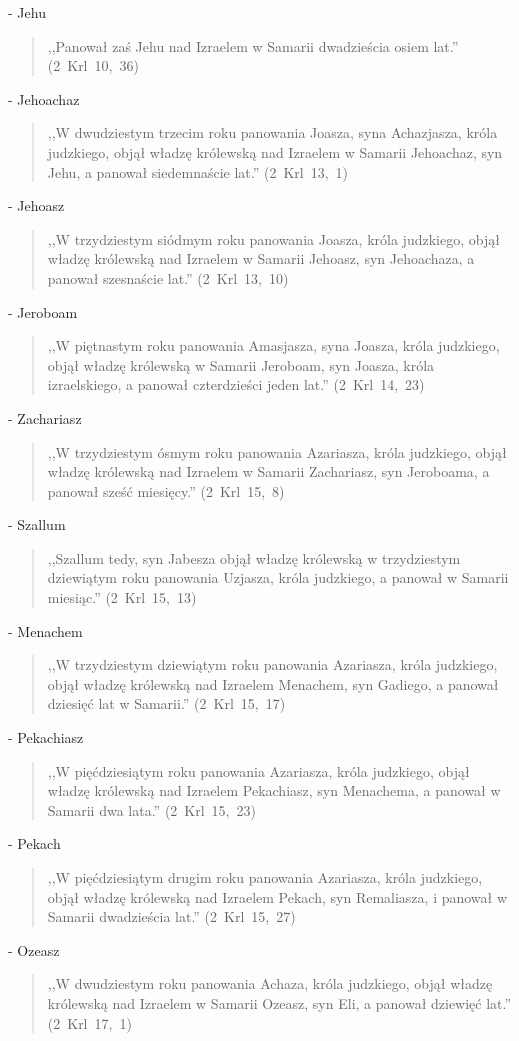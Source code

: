 \documentclass[10pt,a4paper,oneside]{article}
\begin{document}
- Jehu
\begin{quote}
,,Panował zaś Jehu nad Izraelem w Samarii dwadzieścia osiem lat.'' \mbox{(2 Krl 10, 36)}
\end{quote}
- Jehoachaz
\begin{quote}
,,W dwudziestym trzecim roku panowania Joasza, syna Achazjasza, króla judzkiego, objął władzę królewską nad Izraelem w Samarii Jehoachaz, syn Jehu, a panował siedemnaście lat.'' \mbox{(2 Krl 13, 1)}
\end{quote}
- Jehoasz
\begin{quote}
,,W trzydziestym siódmym roku panowania Joasza, króla judzkiego, objął władzę królewską nad Izraelem w Samarii Jehoasz, syn Jehoachaza, a panował szesnaście lat.'' \mbox{(2 Krl 13, 10)}
\end{quote}
- Jeroboam
\begin{quote}
,,W piętnastym roku panowania Amasjasza, syna Joasza, króla judzkiego, objął władzę królewską w Samarii Jeroboam, syn Joasza, króla izraelskiego, a panował czterdzieści jeden lat.'' \mbox{(2 Krl 14, 23)}
\end{quote}
- Zachariasz
\begin{quote}
,,W trzydziestym ósmym roku panowania Azariasza, króla judzkiego, objął władzę królewską nad Izraelem w Samarii Zachariasz, syn Jeroboama, a panował sześć miesięcy.'' \mbox{(2 Krl 15, 8)}
\end{quote}
- Szallum
\begin{quote}
,,Szallum tedy, syn Jabesza objął władzę królewską w trzydziestym dziewiątym roku panowania Uzjasza, króla judzkiego, a panował w Samarii miesiąc.'' \mbox{(2 Krl 15, 13)}
\end{quote}
- Menachem
\begin{quote}
,,W trzydziestym dziewiątym roku panowania Azariasza, króla judzkiego, objął władzę królewską nad Izraelem Menachem, syn Gadiego, a panował dziesięć lat w Samarii.'' \mbox{(2 Krl 15, 17)}
\end{quote}
- Pekachiasz
\begin{quote}
,,W pięćdziesiątym roku panowania Azariasza, króla judzkiego, objął władzę królewską nad Izraelem Pekachiasz, syn Menachema, a panował w Samarii dwa lata.'' \mbox{(2 Krl 15, 23)}
\end{quote}
- Pekach
\begin{quote}
,,W pięćdziesiątym drugim roku panowania Azariasza, króla judzkiego, objął władzę królewską nad Izraelem Pekach, syn Remaliasza, i panował w Samarii dwadzieścia lat.'' \mbox{(2 Krl 15, 27)}
\end{quote}
- Ozeasz
\begin{quote}
,,W dwudziestym roku panowania Achaza, króla judzkiego, objął władzę królewską nad Izraelem w Samarii Ozeasz, syn Eli, a panował dziewięć lat.'' \mbox{(2 Krl 17, 1)}
\end{quote}
\end{document}
